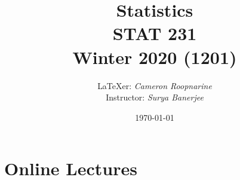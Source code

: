 



\title{
\LARGE Statistics\\
\large STAT 231\\
\normalsize Winter 2020 (1201)}
\author{\LaTeX{}er: \emph{Cameron Roopnarine}\\Instructor: \emph{Surya Banerjee}}
\date{\today}



\maketitle
\tableofcontents
























\chapter{Online Lectures}


%


